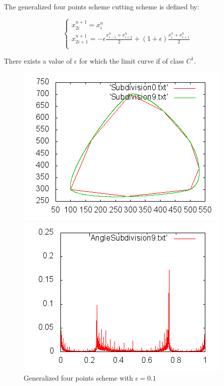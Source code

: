 \documentclass[a4paper,11pt]{article}
\begin{document}
The generalized four points scheme cutting scheme is defined by:

$$
    \begin{cases}
        x_{2i}^{n+1} = x_i^n \\
        x_{2i+1}^{n+1} = -\epsilon \frac{x_{i-1}^n + x_{i+2}^n}{2} +
        (1 + \epsilon) \frac{x_i^n + x_{i+1}^n}{2} \\
    \end{cases}
$$

There exists a value of $ \epsilon $ for which the limit curve if of class $ C^1
$.

\begin{figure}[H]
\centering
\begin{minipage}{0.35\paperwidth}
\includegraphics[scale=0.75]{pic/poly3.png}
\end{minipage}
\begin{minipage}{0.35\paperwidth}
\includegraphics[scale=0.75]{pic/angle3.png}
\end{minipage}
\caption{Generalized four points scheme with $ \epsilon = 0.1 $}
\end{figure}
\end{document}
